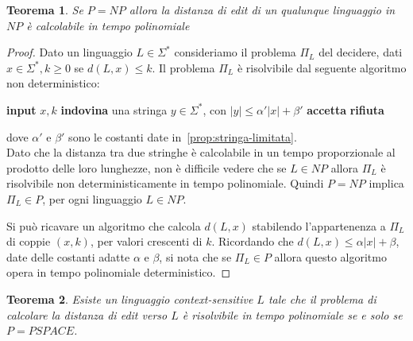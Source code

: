 \documentclass[a4paper,12pt]{report}
\newtheorem{theorem}{Teorema}[chapter]
\theoremstyle{propositionstyle}
\begin{document}
    \begin{theorem}
        Se $P = NP$ allora la distanza di edit di un qualunque linguaggio in $NP$ è calcolabile in tempo polinomiale
    \end{theorem}
    \begin{proof}
        Dato un linguaggio $L \in \Sigma^*$ consideriamo il problema $\Pi_L$ del decidere, dati $x \in \Sigma^*, k \geq 0$ se $d\left(L, x\right) \leq k$.
        Il problema $\Pi_L$ è risolvibile dal seguente algoritmo non deterministico:

        \vspace{0.5em}

        \begin{algorithm}
            \begin{algorithmic}[1]
                \State \textbf{input} $x, k$
                \State \textbf{indovina} una stringa $y \in \Sigma^*$, con $|y| \le \alpha'|x| + \beta'$
                    \State \textbf{accetta}
                \Else
                    \State \textbf{rifiuta}
                \EndIf
            \end{algorithmic}
        \end{algorithm}

        \noindent dove $\alpha'$ e $\beta'$ sono le costanti date in~\ref{prop:stringa-limitata}. \\
        Dato che la distanza tra due stringhe è calcolabile in un tempo proporzionale al prodotto delle loro lunghezze,
        non è difficile vedere che se $L \in NP$ allora $\Pi_L$ è risolvibile non deterministicamente in tempo polinomiale.
        Quindi $P = NP$ implica $\Pi_L \in P$, per ogni linguaggio $L \in NP$.

        Si può ricavare un algoritmo che calcola $d\left(L, x\right)$ stabilendo l'appartenenza a $\Pi_L$ di coppie $\left(x, k\right)$, per valori crescenti di $k$.
        Ricordando che $d\left(L, x\right) \leq \alpha\lvert x\rvert + \beta$, date delle costanti adatte $\alpha$ e $\beta$, si nota che se $\Pi_L \in P$ allora questo algoritmo opera in tempo polinomiale deterministico.
    \end{proof}

    \begin{theorem}
        Esiste un linguaggio context-sensitive \(L\) tale che il problema di calcolare la distanza di edit verso \(L\) è risolvibile in tempo polinomiale se e solo se \(P = PSPACE\).
    \end{theorem}
\end{document}
